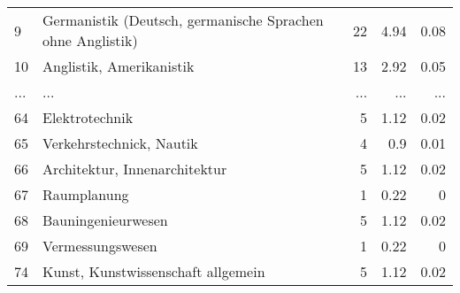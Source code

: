 \begin{longtable}{lXrrr}
        9 & \multicolumn{1}{X}{Germanistik (Deutsch, germanische Sprachen ohne Anglistik)} & %
          \num{22} &
          \num[round-mode=places,round-precision=2]{4,94} &
          \num[round-mode=places,round-precision=2]{0,08} \\
        10 & \multicolumn{1}{X}{Anglistik, Amerikanistik} & %
          \num{13} &
          \num[round-mode=places,round-precision=2]{2,92} &
          \num[round-mode=places,round-precision=2]{0,05} \\
       ... & ... & ... & ... & ... \\
        64 & \multicolumn{1}{X}{Elektrotechnik} & %
          \num{5} &
          \num[round-mode=places,round-precision=2]{1,12} &
          \num[round-mode=places,round-precision=2]{0,02} \\

        65 & \multicolumn{1}{X}{Verkehrstechnick, Nautik} & %
          \num{4} &
          \num[round-mode=places,round-precision=2]{0,9} &
          \num[round-mode=places,round-precision=2]{0,01} \\

        66 & \multicolumn{1}{X}{Architektur, Innenarchitektur} & %
          \num{5} &
          \num[round-mode=places,round-precision=2]{1,12} &
          \num[round-mode=places,round-precision=2]{0,02} \\

        67 & \multicolumn{1}{X}{Raumplanung} & %
          \num{1} &
          \num[round-mode=places,round-precision=2]{0,22} &
          \num[round-mode=places,round-precision=2]{0} \\

        68 & \multicolumn{1}{X}{Bauningenieurwesen} & %
          \num{5} &
          \num[round-mode=places,round-precision=2]{1,12} &
          \num[round-mode=places,round-precision=2]{0,02} \\

        69 & \multicolumn{1}{X}{Vermessungswesen} & %
          \num{1} &
          \num[round-mode=places,round-precision=2]{0,22} &
          \num[round-mode=places,round-precision=2]{0} \\

        74 & \multicolumn{1}{X}{Kunst, Kunstwissenschaft allgemein} & %
          \num{5} &
          \num[round-mode=places,round-precision=2]{1,12} &
          \num[round-mode=places,round-precision=2]{0,02} \\


\end{longtable}
